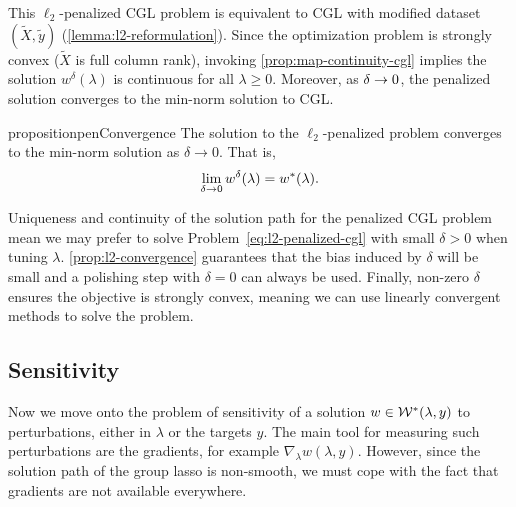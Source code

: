 This \( \ell_2 \)-penalized CGL problem is equivalent to
CGL with modified dataset \( (\tilde X, \tilde y) \) (\cref{lemma:l2-reformulation}).
Since the optimization problem is strongly convex (\( \tilde X \) is full column rank),
invoking \cref{prop:map-continuity-cgl} implies the solution \( w^\delta(\lambda) \) is continuous for all \( \lambda \geq 0 \).
Moreover, as \( \delta \rightarrow 0 \), the penalized solution converges
to the min-norm solution to CGL.
\begin{restatable}{proposition}{penConvergence}\label{prop:l2-convergence}
    The solution to the \( \ell_2 \)-penalized problem converges to
    the min-norm solution as \( \delta \rightarrow 0 \).
    That is,
    \[
        \lim_{\delta \rightarrow 0} w^\delta(\lambda) = w^*(\lambda).
    \]
\end{restatable}

Uniqueness and continuity of the solution path for the penalized CGL
problem mean we may prefer to solve
Problem~\eqref{eq:l2-penalized-cgl} with small \( \delta > 0 \) when
tuning \( \lambda \).
\cref{prop:l2-convergence} guarantees that the bias induced by \( \delta \)
will be small and a polishing step with \( \delta = 0 \) can always be used.
Finally, non-zero \( \delta \) ensures the objective is strongly convex,
meaning we can use linearly convergent methods to solve the problem.


\subsection{Sensitivity}

Now we move onto the problem of sensitivity of a solution
\( w \in \mathcal{W}^*(\lambda, y) \)
to perturbations, either in \( \lambda \) or the targets \( y \).
The main tool for measuring such perturbations are the gradients, for example
\( \nabla_\lambda w(\lambda, y) \).
However, since the solution path of the group lasso is non-smooth,
we must cope with the fact that gradients are not available everywhere.


